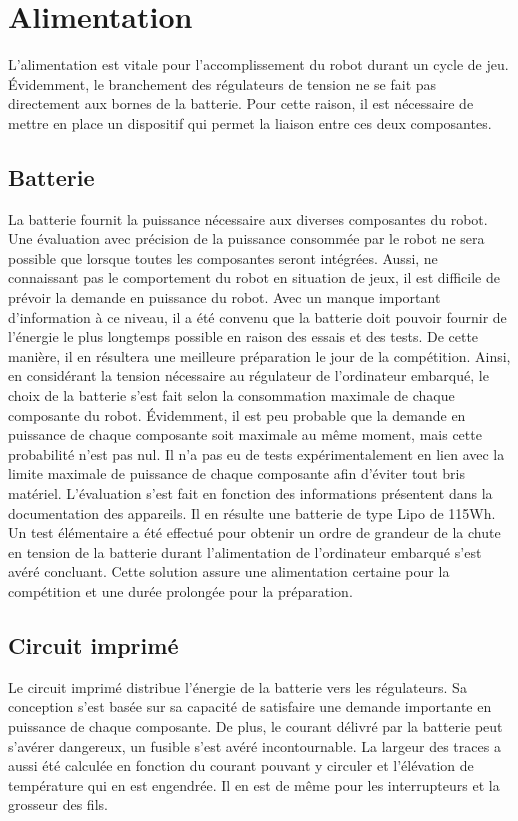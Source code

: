 \section{Alimentation}

L’alimentation est vitale pour l’accomplissement du robot durant un cycle de jeu. Évidemment, le branchement des régulateurs de tension ne se fait pas directement aux bornes de la batterie. Pour cette raison, il est nécessaire de mettre en place un dispositif qui permet la liaison entre ces deux composantes.

\subsection{Batterie} 

La batterie fournit la puissance nécessaire aux diverses composantes du robot. Une évaluation avec précision de la puissance consommée par le robot ne sera possible que lorsque toutes les composantes seront intégrées. Aussi, ne connaissant pas le comportement du robot en situation de jeux, il est difficile de prévoir la demande en puissance du robot. Avec un manque important d’information à ce niveau, il a été convenu que la batterie doit pouvoir fournir de l’énergie le plus longtemps possible en raison des essais et des tests. De cette manière, il en résultera une meilleure préparation le jour de la compétition.  Ainsi, en considérant la tension nécessaire au régulateur de l’ordinateur embarqué, le choix de la batterie s’est fait selon la consommation maximale de chaque composante du robot. Évidemment, il est peu probable que la demande en puissance de chaque composante soit maximale au même moment, mais cette probabilité n’est pas nul. Il n’a pas eu de tests expérimentalement en lien avec la limite maximale de puissance de chaque composante afin d’éviter tout bris matériel. L’évaluation s’est fait en fonction des informations présentent dans la documentation des appareils. Il en résulte une batterie de type Lipo de 115Wh. Un test élémentaire a été effectué pour obtenir un ordre de grandeur de la chute en tension de la batterie durant l’alimentation de l’ordinateur embarqué s’est avéré concluant. Cette solution assure une alimentation certaine pour la compétition et une durée prolongée pour la préparation.
 
\subsection{Circuit imprimé}

Le circuit imprimé distribue l’énergie de la batterie vers les régulateurs. Sa conception s’est basée sur sa capacité de satisfaire une demande importante en puissance de chaque composante. De plus, le courant délivré par la batterie peut s’avérer dangereux, un fusible s’est avéré incontournable. La largeur des traces a aussi été calculée en fonction du courant pouvant y circuler et l’élévation de température qui en est engendrée. Il en est de même pour les interrupteurs et la grosseur des fils. 


